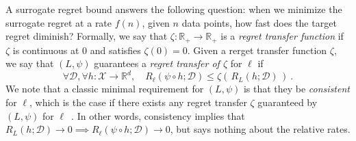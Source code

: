 \documentclass{article}
\theoremstyle{definition}\newtheorem{definition}{Definition}
\theoremstyle{definition}\newtheorem{assumption}{Assumption}
\newcommand{\Comments}{0}
\newcommand{\mynote}[2]{\ifnum\Comments=1\textcolor{#1}{#2}\fi}
\newcommand{\raf}[1]{\mynote{green}{[RF: #1]}}
\newcommand{\reals}{\mathbb{R}}
\newcommand{\D}{\mathcal{D}}
\newcommand{\X}{\mathcal{X}}
\begin{document}
A surrogate regret bound answers the following question: when we minimize the surrogate regret at a rate $f(n)$, given $n$ data points, how fast does the target regret diminish?
Formally, we say that $\zeta : \reals_+ \to \reals_+$ is a \emph{regret transfer function} if $\zeta$ is continuous at $0$ and satisfies $\zeta(0) = 0$.
Given a rerget transfer function $\zeta$, we say that $(L,\psi)$ guarantees a \emph{regret transfer of $\zeta$} for $\ell$ if
\begin{equation}
  \label{eq:surrogate-regret-bound}
  \forall \D, \forall h:\X\to\reals^d, \quad R_\ell(\psi\circ h;\D) \leq \zeta(\, R_L(h;\D) \,)~.
\end{equation}
We note that a classic minimal requirement for $(L,\psi)$ is that they be \emph{consistent} for $\ell$, which is the case if there exists any regret transfer $\zeta$ guaranteed by $(L,\psi)$ for $\ell$~\cite{steinwart2008support}.
In other words, consistency implies that $R_L(h;\D) \to 0 \implies R_{\ell}(\psi \circ h;\D) \to 0$, but says nothing about the relative rates.


\end{document}
